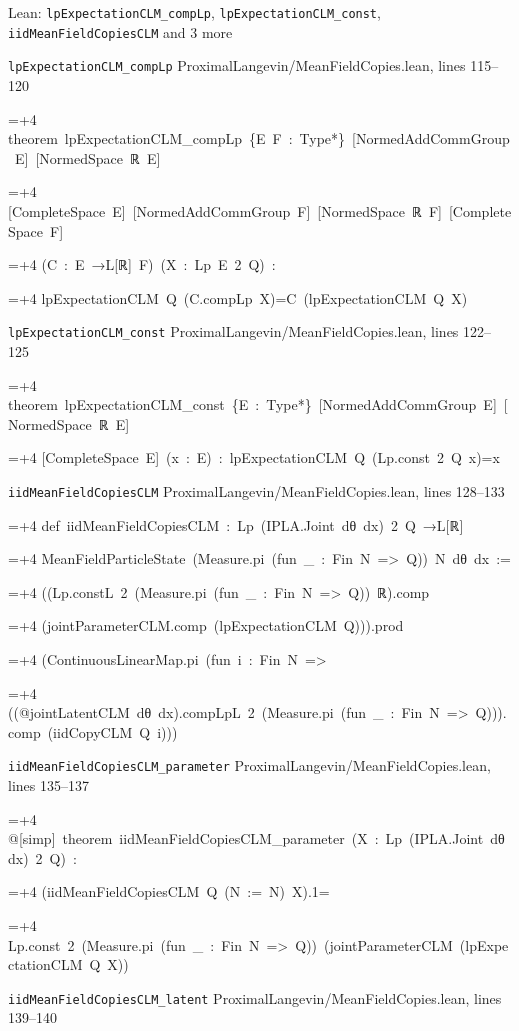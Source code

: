 \documentclass[11pt,a4paper]{article}
\newlength{\leancharwidth}
\newenvironment{leancode}{\par\smallskip\begingroup\ttfamily\footnotesize\raggedright
  \settowidth{\leancharwidth}{M}\setlength{\parskip}{0pt}\setlength{\parindent}{0pt}
  \frenchspacing}{\par\endgroup\smallskip}
\newcommand{\leanline}[2]{\hangindent=\dimexpr#1\leancharwidth+4\leancharwidth\relax
  \hangafter=1\noindent\hspace*{#1\leancharwidth}#2\par}
\newcommand{\leansource}[1]{\par{\footnotesize\color{leanmuted}#1}\par}
\begin{document}
\begin{leanbox}{Lean: \texttt{lpExpectationCLM\_\allowbreak{}compLp}, \texttt{lpExpectationCLM\_\allowbreak{}const}, \texttt{iidMeanFieldCopiesCLM} and 3 more}
\leansource{\texttt{lpExpectationCLM\_\allowbreak{}compLp} \quad ProximalLangevin/\allowbreak{}MeanFieldCopies.lean, lines 115–120}
\begin{leancode}
\leanline{0}{theorem\ lpExpectationCLM\_compLp\ \{E\ F\ :\ Type*\}\ [NormedAddCommGroup\ E]\ [NormedSpace\ ℝ\ E]}
\leanline{4}{[CompleteSpace\ E]\ [NormedAddCommGroup\ F]\ [NormedSpace\ ℝ\ F]\ [CompleteSpace\ F]}
\leanline{4}{(C\ :\ E\ →L[ℝ]\ F)\ (X\ :\ Lp\ E\ 2\ Q)\ :}
\leanline{4}{lpExpectationCLM\ Q\ (C.compLp\ X)=C\ (lpExpectationCLM\ Q\ X)}
\end{leancode}
\leansource{\texttt{lpExpectationCLM\_\allowbreak{}const} \quad ProximalLangevin/\allowbreak{}MeanFieldCopies.lean, lines 122–125}
\begin{leancode}
\leanline{0}{theorem\ lpExpectationCLM\_const\ \{E\ :\ Type*\}\ [NormedAddCommGroup\ E]\ [NormedSpace\ ℝ\ E]}
\leanline{4}{[CompleteSpace\ E]\ (x\ :\ E)\ :\ lpExpectationCLM\ Q\ (Lp.const\ 2\ Q\ x)=x}
\end{leancode}
\leansource{\texttt{iidMeanFieldCopiesCLM} \quad ProximalLangevin/\allowbreak{}MeanFieldCopies.lean, lines 128–133}
\begin{leancode}
\leanline{0}{def\ iidMeanFieldCopiesCLM\ :\ Lp\ (IPLA.Joint\ dθ\ dx)\ 2\ Q\ →L[ℝ]}
\leanline{4}{MeanFieldParticleState\ (Measure.pi\ (fun\ \_\ :\ Fin\ N\ =>\ Q))\ N\ dθ\ dx\ :=}
\leanline{2}{((Lp.constL\ 2\ (Measure.pi\ (fun\ \_\ :\ Fin\ N\ =>\ Q))\ ℝ).comp}
\leanline{4}{(jointParameterCLM.comp\ (lpExpectationCLM\ Q))).prod}
\leanline{4}{(ContinuousLinearMap.pi\ (fun\ i\ :\ Fin\ N\ =>}
\leanline{6}{((@jointLatentCLM\ dθ\ dx).compLpL\ 2\ (Measure.pi\ (fun\ \_\ :\ Fin\ N\ =>\ Q))).comp\ (iidCopyCLM\ Q\ i)))}
\end{leancode}
\leansource{\texttt{iidMeanFieldCopiesCLM\_\allowbreak{}parameter} \quad ProximalLangevin/\allowbreak{}MeanFieldCopies.lean, lines 135–137}
\begin{leancode}
\leanline{0}{@[simp]\ theorem\ iidMeanFieldCopiesCLM\_parameter\ (X\ :\ Lp\ (IPLA.Joint\ dθ\ dx)\ 2\ Q)\ :}
\leanline{4}{(iidMeanFieldCopiesCLM\ Q\ (N\ :=\ N)\ X).1=}
\leanline{6}{Lp.const\ 2\ (Measure.pi\ (fun\ \_\ :\ Fin\ N\ =>\ Q))\ (jointParameterCLM\ (lpExpectationCLM\ Q\ X))}
\end{leancode}
\leansource{\texttt{iidMeanFieldCopiesCLM\_\allowbreak{}latent} \quad ProximalLangevin/\allowbreak{}MeanFieldCopies.lean, lines 139–140}

\end{leanbox}
\end{document}
